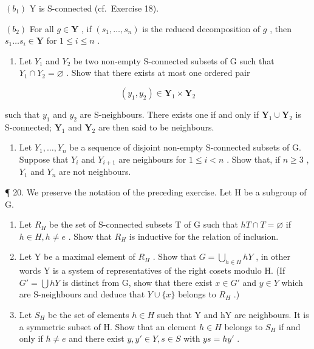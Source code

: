 \((b_{1})\) Y is S-connected (cf.~Exercise 18).

\((b_{2})\) For all \(g \in \mathbf{Y}\) , if \((s_1, \ldots, s_n)\) is the reduced decomposition of \(g\) , then \(s_1 \ldots s_i \in \mathbf{Y}\) for \(1 \leqslant i \leqslant n\) .

\begin{enumerate}
\def\labelenumi{(\alph{enumi})}
\setcounter{enumi}{2}
\tightlist
\item
  Let \(Y_{1}\) and \(Y_{2}\) be two non-empty S-connected subsets of G such that \(Y_{1} \cap Y_{2} = \varnothing\) . Show that there exists at most one ordered pair
\end{enumerate}

\[
\left(y _ {1}, y _ {2}\right) \in \mathbf {Y} _ {1} \times \mathbf {Y} _ {2}
\]

such that \(y_{1}\) and \(y_{2}\) are S-neighbours. There exists one if and only if \(\mathbf{Y}_1 \cup \mathbf{Y}_2\) is S-connected; \(\mathbf{Y}_1\) and \(\mathbf{Y}_2\) are then said to be neighbours.

\begin{enumerate}
\def\labelenumi{(\alph{enumi})}
\setcounter{enumi}{3}
\tightlist
\item
  Let \(Y_{1}, \ldots, Y_{n}\) be a sequence of disjoint non-empty S-connected subsets of G. Suppose that \(Y_{i}\) and \(Y_{i+1}\) are neighbours for \(1 \leqslant i < n\) . Show that, if \(n \geqslant 3\) , \(Y_{1}\) and \(Y_{n}\) are not neighbours.
\end{enumerate}

¶ 20. We preserve the notation of the preceding exercise. Let H be a subgroup of G.

\begin{enumerate}
\def\labelenumi{(\alph{enumi})}
\item
  Let \(R_{H}\) be the set of S-connected subsets T of G such that \(hT \cap T = \varnothing\) if \(h \in H, h \neq e\) . Show that \(R_{H}\) is inductive for the relation of inclusion.
\item
  Let Y be a maximal element of \(R_{H}\) . Show that \(G = \bigcup_{h \in H} hY\) , in other words Y is a system of representatives of the right cosets modulo H. (If \(G' = \bigcup hY\) is distinct from G, show that there exist \(x \in G'\) and \(y \in Y\) which are S-neighbours and deduce that \(Y \cup \{x\}\) belongs to \(R_{H}\) .)
\item
  Let \(S_{H}\) be the set of elements \(h \in H\) such that Y and hY are neighbours. It is a symmetric subset of H. Show that an element \(h \in H\) belongs to \(S_{H}\) if and only if \(h \neq e\) and there exist \(y, y' \in Y, s \in S\) with \(ys = hy'\) .
\end{enumerate}

